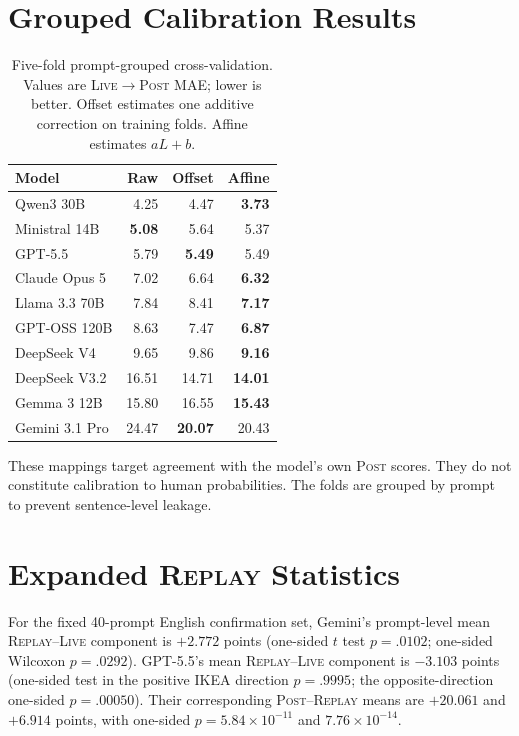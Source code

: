 \documentclass[10pt]{article}
\newcommand{\live}{\textsc{Live}}
\newcommand{\replay}{\textsc{Replay}}
\newcommand{\post}{\textsc{Post}}
\newcommand{\papersection}[1]{\Needspace{4.4\baselineskip}\section{#1}}
\begin{document}
\papersection{Grouped Calibration Results}
\label{app:calibration}
\begin{table}[H]
\centering
\small
\setlength{\tabcolsep}{4pt}
\caption{Five-fold prompt-grouped cross-validation. Values are \live{}$\rightarrow$\post{} MAE; lower is better. Offset estimates one additive correction on training folds. Affine estimates $aL+b$.}
\begin{tabular}{lrrr}
\toprule
Model & Raw & Offset & Affine \\
\midrule
Qwen3 30B & 4.25 & 4.47 & \textbf{3.73} \\
Ministral 14B & \textbf{5.08} & 5.64 & 5.37 \\
GPT-5.5 & 5.79 & \textbf{5.49} & 5.49 \\
Claude Opus 5 & 7.02 & 6.64 & \textbf{6.32} \\
Llama 3.3 70B & 7.84 & 8.41 & \textbf{7.17} \\
GPT-OSS 120B & 8.63 & 7.47 & \textbf{6.87} \\
DeepSeek V4 & 9.65 & 9.86 & \textbf{9.16} \\
DeepSeek V3.2 & 16.51 & 14.71 & \textbf{14.01} \\
Gemma 3 12B & 15.80 & 16.55 & \textbf{15.43} \\
Gemini 3.1 Pro & 24.47 & \textbf{20.07} & 20.43 \\
\bottomrule
\end{tabular}
\end{table}
These mappings target agreement with the model's own \post{} scores. They do not constitute calibration to human probabilities. The folds are grouped by prompt to prevent sentence-level leakage.

\papersection{Expanded \replay{} Statistics}
\label{app:replay}
For the fixed 40-prompt English confirmation set, Gemini's prompt-level mean \replay{}--\live{} component is $+2.772$ points (one-sided $t$ test $p=.0102$; one-sided Wilcoxon $p=.0292$). GPT-5.5's mean \replay{}--\live{} component is $-3.103$ points (one-sided test in the positive IKEA direction $p=.9995$; the opposite-direction one-sided $p=.00050$). Their corresponding \post{}--\replay{} means are $+20.061$ and $+6.914$ points, with one-sided $p=5.84\times10^{-11}$ and $7.76\times10^{-14}$.
\end{document}
